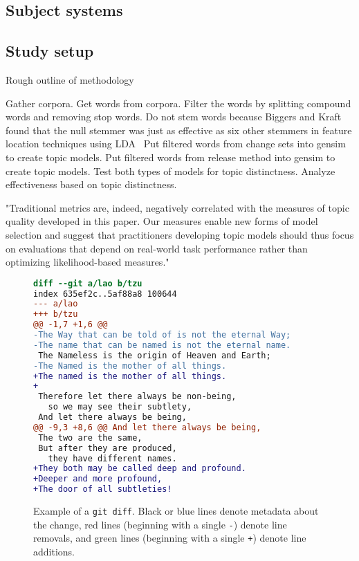 

\subsection{Subject systems}


\subsection{Study setup}

Rough outline of methodology

Gather corpora.
Get words from corpora.
Filter the words by splitting compound words and removing stop words.
Do not stem words because Biggers and Kraft found that the null stemmer was just as effective as six other stemmers in feature location techniques using LDA~\cite{Biggers-Kraft:2012}
Put filtered words from change sets into gensim to create topic models.
Put filtered words from release method into gensim to create topic models.
Test both types of models for topic distinctness.
Analyze effectiveness based on topic distinctness.


"Traditional metrics are, indeed, negatively correlated with the
measures of topic quality developed in this paper.  Our measures enable
new forms of model selection and suggest that practitioners developing
topic models should thus focus on evaluations that depend on real-world
task performance rather than optimizing likelihood-based measures." ~\cite{Chang-etal:2009}

\begin{figure}[ht]
\centering
\footnotesize
\begin{lstlisting}[language=diff, basicstyle=\ttfamily]
diff --git a/lao b/tzu
index 635ef2c..5af88a8 100644
--- a/lao
+++ b/tzu
@@ -1,7 +1,6 @@
-The Way that can be told of is not the eternal Way;
-The name that can be named is not the eternal name.
 The Nameless is the origin of Heaven and Earth;
-The Named is the mother of all things.
+The named is the mother of all things.
+
 Therefore let there always be non-being,
   so we may see their subtlety,
 And let there always be being,
@@ -9,3 +8,6 @@ And let there always be being,
 The two are the same,
 But after they are produced,
   they have different names.
+They both may be called deep and profound.
+Deeper and more profound,
+The door of all subtleties!
\end{lstlisting}
\caption{Example of a \texttt{git diff}. Black or blue lines denote metadata about the change, red lines (beginning with a single \texttt{-}) denote line removals, and green lines (beginning with a single \texttt{+}) denote line additions.}
\label{fig:diff}
\end{figure}

